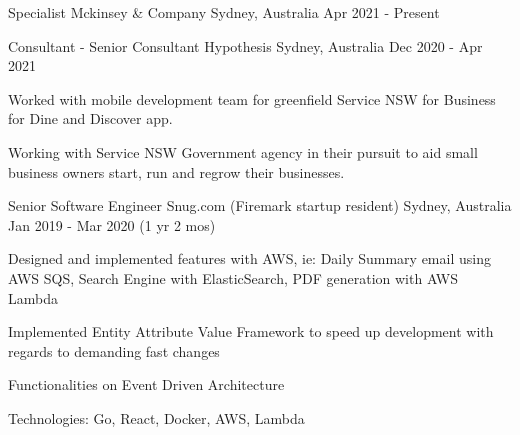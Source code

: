 

\begin{cventries}

  \cventry
  {Specialist} %
  {Mckinsey \& Company} %
  {Sydney, Australia} %
  {Apr 2021 - Present} %
  {
    \begin{cvitems} %
    \end{cvitems}
  }

  \cventry
  {Consultant - Senior Consultant} %
  {Hypothesis} %
  {Sydney, Australia} %
  {Dec 2020 - Apr 2021} %
  {
    \begin{cvitems} %
      \item {Worked with mobile development team for greenfield Service NSW for Business for Dine and Discover app.}
      \item {Working with Service NSW Government agency in their pursuit to aid small business owners start, run and regrow their businesses.}
    \end{cvitems}
  }

  \cventry
  {Senior Software Engineer} %
  {Snug.com (Firemark startup resident)} %
  {Sydney, Australia} %
  {Jan 2019 - Mar 2020 (1 yr 2 mos)} %
  {
    \begin{cvitems} %
      \item{Designed and implemented features with AWS, ie: Daily Summary email using AWS SQS, Search Engine with ElasticSearch, PDF generation with AWS Lambda}
      \item{Implemented Entity Attribute Value Framework to speed up development with regards to demanding fast changes}
      \item{Functionalities on Event Driven Architecture}
      \item{Technologies: Go, React, Docker, AWS, Lambda}
    \end{cvitems}
  }


\end{cventries}
